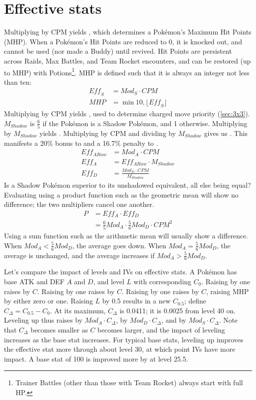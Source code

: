 \section{Effective stats\label{sec:effectivestats}}
Multiplying  by CPM yields , which determines a Pokémon's Maximum Hit Points (MHP).
When a Pokémon's Hit Points are reduced to 0, it is knocked out, and cannot be
 used (nor made a Buddy) until revived.
Hit Points are persistent across Raids, Max Battles, and Team Rocket encounters,
 and can be restored (up to MHP) with Potions\footnote{Trainer Battles (other
 than those with Team Rocket) always start with full HP.}.
MHP is defined such that it is always an integer not less than ten:
\begin{align*}
 \mathit{Eff_S} &= \mathit{Mod_S} \cdot CPM \\
 MHP &= \min{10, \lfloor \mathit{Eff_S} \rfloor}
\end{align*}
Multiplying  by CPM yields , used to determine charged move priority (\autoref{sec:3x3}).
$M_{Shadow}$ is $\frac{6}{5}$ if the Pokémon is a Shadow Pokémon, and 1 otherwise.
Multiplying  by $M_{Shadow}$ yields .
Multiplying  by CPM and dividing by $M_{Shadow}$ gives us .
This manifests a 20\% bonus to  and a 16.7\% penalty to .
\begin{align*}
  Eff_{ARaw} &= Mod_A \cdot CPM\\
  Eff_A &= Eff_{ARaw} \cdot M_{Shadow} \\
 Eff_D &= \frac{Mod_D \cdot CPM}{M_{Shadow}}
\end{align*}
Is a Shadow Pokémon superior to its unshadowed equivalent, all else being equal?
Evaluating using a product function such as the geometric mean will show no difference;
 the two multipliers cancel one another.
\begin{align*}
  P &= Eff_A \cdot Eff_D\\
  &= \frac{6}{5}Mod_A \cdot \frac{5}{6}Mod_D \cdot CPM^2
\end{align*}
Using a sum function such as the arithmetic mean will usually show a difference.
When $Mod_A < \frac{5}{6}Mod_D$, the average goes down.
When $Mod_A = \frac{5}{6}Mod_D$, the average is unchanged,
 and the average increases if $Mod_A > \frac{5}{6}Mod_D$.

Let's compare the impact of levels and IVs on effective stats.
A Pokémon has base ATK and DEF $A$ and $D$, and level $L$ with corresponding \CPM{} $C_0$.
Raising  by one raises  by $C$.
Raising  by one raises  by $C$.
Raising  by one raises  by $C$, raising MHP by either zero or one.
Raising $L$ by 0.5 results in a new \CPM{} $C_{0.5}$; define $C_Δ = C_{0.5} - C_0$.
At its maximum, $C_Δ$ is 0.0411; it is 0.0025 from level 40 on.
Leveling up thus raises  by $Mod_A \cdot C_Δ$,
  by $Mod_D \cdot C_Δ$,
 and  by $Mod_S \cdot C_Δ$.
Note that $C_Δ$ becomes smaller as $C$ becomes larger,
 and the impact of leveling increases as the base stat increases.
For typical base stats, leveling up improves the effective stat more through
 about level 30, at which point IVs have more impact.
A base stat of 100 is improved more by \IV{} at level 25.5.

